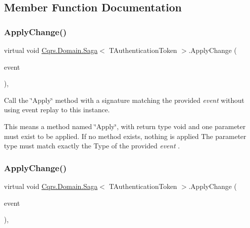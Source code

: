 \subsection{Member Function Documentation}
\mbox{\label{classCqrs_1_1Domain_1_1Saga_af8a1eddbadc8fc3fb69f18691f3b08ac_af8a1eddbadc8fc3fb69f18691f3b08ac}} 
\subsubsection{\texorpdfstring{Apply\+Change()}{ApplyChange()}\hspace{0.1cm}{\footnotesize\ttfamily [1/2]}}
{\footnotesize\ttfamily virtual void \hyperlink{classCqrs_1_1Domain_1_1Saga}{Cqrs.\+Domain.\+Saga}$<$ T\+Authentication\+Token $>$.Apply\+Change (\begin{DoxyParamCaption}\item[{\hyperlink{interfaceCqrs_1_1Events_1_1ISagaEvent}{I\+Saga\+Event}$<$ T\+Authentication\+Token $>$ @}]{event }\end{DoxyParamCaption})\hspace{0.3cm}{\ttfamily [protected]}, {\ttfamily [virtual]}}



Call the \char`\"{}\+Apply\char`\"{} method with a signature matching the provided {\itshape event}  without using event replay to this instance. 

This means a method named \char`\"{}\+Apply\char`\"{}, with return type void and one parameter must exist to be applied. If no method exists, nothing is applied The parameter type must match exactly the Type of the provided {\itshape event} . \mbox{\label{classCqrs_1_1Domain_1_1Saga_a25462563492d834e297388e0648a57ac_a25462563492d834e297388e0648a57ac}} 
\subsubsection{\texorpdfstring{Apply\+Change()}{ApplyChange()}\hspace{0.1cm}{\footnotesize\ttfamily [2/2]}}
{\footnotesize\ttfamily virtual void \hyperlink{classCqrs_1_1Domain_1_1Saga}{Cqrs.\+Domain.\+Saga}$<$ T\+Authentication\+Token $>$.Apply\+Change (\begin{DoxyParamCaption}\item[{\hyperlink{interfaceCqrs_1_1Events_1_1IEvent}{I\+Event}$<$ T\+Authentication\+Token $>$ @}]{event }\end{DoxyParamCaption})\hspace{0.3cm}{\ttfamily [protected]}, {\ttfamily [virtual]}}



